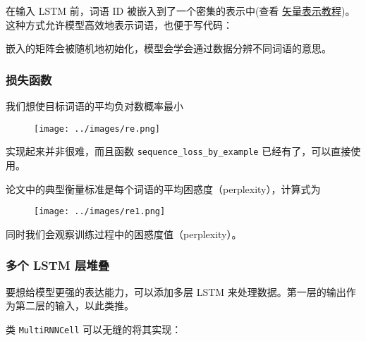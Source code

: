 在输入 LSTM 前，词语 ID 被嵌入到了一个密集的表示中(查看
\href{tensorflow-zh/SOURCE/tutorials/word2vec/index.md}{矢量表示教程})。这种方式允许模型高效地表示词语，也便于写代码：

\begin{Shaded}
\begin{Highlighting}[]
\OperatorTok{=} 
\end{Highlighting}
\end{Shaded}

嵌入的矩阵会被随机地初始化，模型会学会通过数据分辨不同词语的意思。

\subsubsection{损失函数 }\label{ux635fux5931ux51fdux6570}

我们想使目标词语的平均负对数概率最小

\begin{figure}[htbp]
\centering
\texttt{[image: ../images/re.png]}
\caption{}
\end{figure}

实现起来并非很难，而且函数 \texttt{sequence\_loss\_by\_example}
已经有了，可以直接使用。

论文中的典型衡量标准是每个词语的平均困惑度（perplexity），计算式为

\begin{figure}[htbp]
\centering
\texttt{[image: ../images/re1.png]}
\caption{}
\end{figure}

同时我们会观察训练过程中的困惑度值（perplexity）。

\subsubsection{多个 LSTM 层堆叠
}\label{ux591aux4e2a-lstm-ux5c42ux5806ux53e0}

要想给模型更强的表达能力，可以添加多层 LSTM
来处理数据。第一层的输出作为第二层的输入，以此类推。

类 \texttt{MultiRNNCell} 可以无缝的将其实现：

